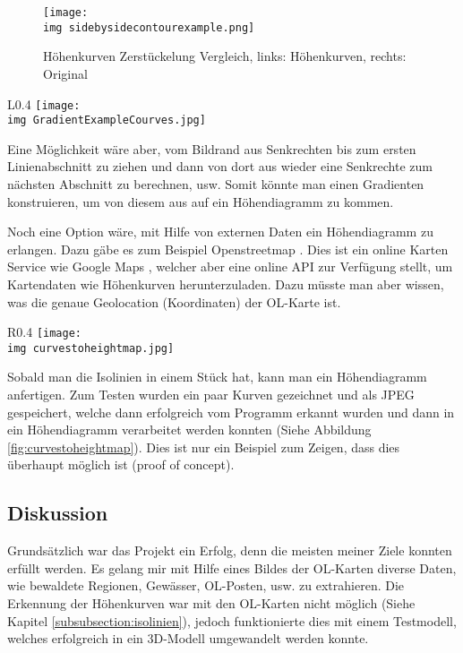 \newpage

\begin{figure}[hbt]
	\centering
	\texttt{[image: \\img sidebysidecontourexample.png]}
	\caption{Höhenkurven Zerstückelung Vergleich, links: Höhenkurven, rechts: Original}
	\label{fig:courvecompare}
\end{figure}

\begin{wrapfigure}{L}{0.4\textwidth}
	\centering
	\texttt{[image: \\img GradientExampleCourves.jpg]}
	\caption{Gradienten Lösungsansatz}
	\label{fig:gradientexample}
\end{wrapfigure}

Eine Möglichkeit wäre aber, vom Bildrand aus Senkrechten bis zum ersten Linienabschnitt zu ziehen und dann von dort aus wieder eine Senkrechte zum nächsten Abschnitt zu berechnen, usw. Somit könnte man einen Gradienten konstruieren, um von diesem aus auf ein Höhendiagramm zu kommen.

Noch eine Option wäre, mit Hilfe von externen Daten ein Höhendiagramm zu erlangen. Dazu gäbe es zum Beispiel Openstreetmap \cite{openstreetmap:1}. Dies ist ein online Karten Service wie Google Maps  \cite{googlemaps:1}, welcher aber eine online API zur Verfügung stellt, um Kartendaten wie Höhenkurven herunterzuladen. Dazu müsste man aber wissen, was die genaue Geolocation (Koordinaten) der OL-Karte ist.


\begin{wrapfigure}[9]{R}{0.4\textwidth}
	\centering
	\texttt{[image: \\img curvestoheightmap.jpg]}
	\caption{Höhendiagramm aus Höhenkurven}
	\label{fig:curvestoheightmap}
\end{wrapfigure}

\newpage

Sobald man die Isolinien in einem Stück hat, kann man ein Höhendiagramm anfertigen. Zum Testen wurden ein paar Kurven gezeichnet und als JPEG gespeichert, welche dann erfolgreich vom Programm erkannt wurden und dann in ein Höhendiagramm verarbeitet werden konnten (Siehe Abbildung \ref{fig:curvestoheightmap}). Dies ist nur ein Beispiel zum Zeigen, dass dies überhaupt möglich ist (proof of concept).

\newpage

\subsection{Diskussion}

Grundsätzlich war das Projekt ein Erfolg, denn die meisten meiner Ziele konnten erfüllt werden. Es gelang mir mit Hilfe eines Bildes der OL-Karten diverse Daten, wie bewaldete Regionen, Gewässer, OL-Posten, usw. zu extrahieren. Die Erkennung der Höhenkurven war mit den OL-Karten nicht möglich (Siehe Kapitel \ref{subsubsection:isolinien}), jedoch funktionierte dies  mit einem Testmodell, welches erfolgreich in ein 3D-Modell umgewandelt werden konnte.

